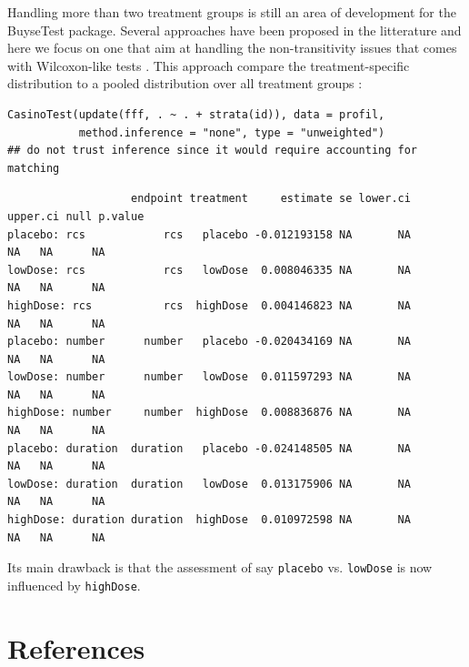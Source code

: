\documentclass[12pt]{article}
\begin{document}
Handling more than two treatment groups is still an area of
development for the BuyseTest package. Several approaches have been
proposed in the litterature and here we focus on one that aim at
handling the non-transitivity issues that comes with Wilcoxon-like
tests \citep{lumley2016characterising}. This approach compare the
treatment-specific distribution to a pooled distribution over all
treatment groups \citep{thangavelu2007wilcoxon}:

\lstset{language=r,label= ,caption= ,captionpos=b,numbers=none}
\begin{lstlisting}
CasinoTest(update(fff, . ~ . + strata(id)), data = profil,
           method.inference = "none", type = "unweighted")
## do not trust inference since it would require accounting for matching
\end{lstlisting}

\begin{verbatim}
                   endpoint treatment     estimate se lower.ci upper.ci null p.value
placebo: rcs            rcs   placebo -0.012193158 NA       NA       NA   NA      NA
lowDose: rcs            rcs   lowDose  0.008046335 NA       NA       NA   NA      NA
highDose: rcs           rcs  highDose  0.004146823 NA       NA       NA   NA      NA
placebo: number      number   placebo -0.020434169 NA       NA       NA   NA      NA
lowDose: number      number   lowDose  0.011597293 NA       NA       NA   NA      NA
highDose: number     number  highDose  0.008836876 NA       NA       NA   NA      NA
placebo: duration  duration   placebo -0.024148505 NA       NA       NA   NA      NA
lowDose: duration  duration   lowDose  0.013175906 NA       NA       NA   NA      NA
highDose: duration duration  highDose  0.010972598 NA       NA       NA   NA      NA
\end{verbatim}

Its main drawback is that the assessment of say \texttt{placebo}
vs. \texttt{lowDose} is now influenced by \texttt{highDose}.


\section*{References}
\label{sec:org1f40a45}
\begingroup
\renewcommand{\section}[2]{}




\endgroup
\end{document}
